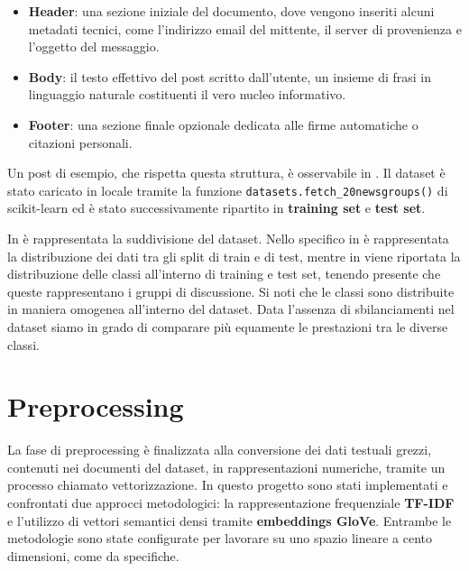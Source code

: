 \documentclass[12pt, a4paper, twoside]{article}
\numberwithin{table}{section}
\begin{document}
    \begin{itemize}
        \item \textbf{Header}: una sezione iniziale del documento, dove vengono inseriti alcuni metadati tecnici, come l'indirizzo email del mittente, il
        server di provenienza e l'oggetto del messaggio.
        \item \textbf{Body}: il testo effettivo del post scritto dall'utente, un insieme di frasi in linguaggio naturale costituenti il vero nucleo informativo.
        \item \textbf{Footer}: una sezione finale opzionale dedicata alle firme automatiche o citazioni personali.
    \end{itemize}
    Un post di esempio, che rispetta questa struttura, è osservabile in . Il dataset è stato caricato in locale tramite la funzione \texttt{datasets.fetch\_20newsgroups()} di scikit-learn ed è stato successivamente ripartito in \textbf{training set} e \textbf{test set}. 
    
    In  è rappresentata la suddivisione del dataset. Nello specifico in  è rappresentata la distribuzione dei dati tra gli split di train e di test, mentre in  viene riportata la distribuzione delle classi all'interno di training 
    e test set, tenendo presente che queste rappresentano i gruppi di discussione. Si noti che le classi sono distribuite in maniera omogenea all'interno del dataset. Data l'assenza di sbilanciamenti nel dataset siamo in grado di comparare più equamente le prestazioni tra le diverse classi.
   
    \clearpage
    \thispagestyle{plain}
    \section{Preprocessing}
    \label{sec:preprocessing}
    La fase di preprocessing è finalizzata alla conversione dei dati testuali grezzi, contenuti nei documenti del dataset,
    in rappresentazioni numeriche, tramite un processo chiamato vettorizzazione. In questo progetto sono stati
    implementati e confrontati due approcci metodologici: la rappresentazione frequenziale \textbf{TF-IDF} e 
    l'utilizzo di vettori semantici densi tramite \textbf{embeddings GloVe}. Entrambe le metodologie sono state configurate
    per lavorare su uno spazio lineare a cento dimensioni, come da specifiche.
    
\end{document}
